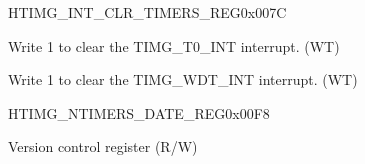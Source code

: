 \begin{register}{H}{TIMG\_INT\_CLR\_TIMERS\_REG}{0x007C}\label{regdesc:TIMGINTCLRTIMERSREG}
%
%
%
\regnewline%
\begin{regdesc}\begin{reglist}
\label{fielddesc:TIMGT0INTCLR}\item [TIMG\_T0\_INT\_CLR] Write 1 to clear the TIMG\_T0\_INT interrupt. (WT)
\label{fielddesc:TIMGWDTINTCLR}\item [TIMG\_WDT\_INT\_CLR] Write 1 to clear the TIMG\_WDT\_INT interrupt. (WT)
\end{reglist}\end{regdesc}
\end{register}


\begin{register}{H}{TIMG\_NTIMERS\_DATE\_REG}{0x00F8}\label{regdesc:TIMGNTIMERSDATEREG}
%
%
\regnewline%
\begin{regdesc}\begin{reglist}
\label{fielddesc:TIMGNTIMGSDATE}\item [TIMG\_NTIMGS\_DATE] Version control register (R/W)
\end{reglist}\end{regdesc}
\end{register}


